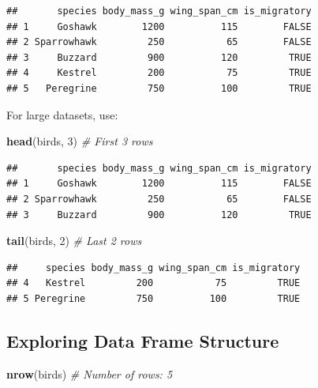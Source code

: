 \documentclass[
]{article}
\newenvironment{Shaded}{\begin{snugshade}}{\end{snugshade}}
\newcommand{\CommentTok}[1]{\textcolor[rgb]{0.56,0.35,0.01}{\textit{#1}}}
\newcommand{\DecValTok}[1]{\textcolor[rgb]{0.00,0.00,0.81}{#1}}
\newcommand{\FunctionTok}[1]{\textcolor[rgb]{0.13,0.29,0.53}{\textbf{#1}}}
\newcommand{\NormalTok}[1]{#1}
\begin{document}
\begin{verbatim}
##       species body_mass_g wing_span_cm is_migratory
## 1     Goshawk        1200          115        FALSE
## 2 Sparrowhawk         250           65        FALSE
## 3     Buzzard         900          120         TRUE
## 4     Kestrel         200           75         TRUE
## 5   Peregrine         750          100         TRUE
\end{verbatim}

For large datasets, use:

\begin{Shaded}
\begin{Highlighting}[]
\FunctionTok{head}\NormalTok{(birds, }\DecValTok{3}\NormalTok{)      }\CommentTok{\# First 3 rows}
\end{Highlighting}
\end{Shaded}

\begin{verbatim}
##       species body_mass_g wing_span_cm is_migratory
## 1     Goshawk        1200          115        FALSE
## 2 Sparrowhawk         250           65        FALSE
## 3     Buzzard         900          120         TRUE
\end{verbatim}

\begin{Shaded}
\begin{Highlighting}[]
\FunctionTok{tail}\NormalTok{(birds, }\DecValTok{2}\NormalTok{)      }\CommentTok{\# Last 2 rows}
\end{Highlighting}
\end{Shaded}

\begin{verbatim}
##     species body_mass_g wing_span_cm is_migratory
## 4   Kestrel         200           75         TRUE
## 5 Peregrine         750          100         TRUE
\end{verbatim}

\subsection{Exploring Data Frame
Structure}\label{exploring-data-frame-structure}

\begin{Shaded}
\begin{Highlighting}[]
\FunctionTok{nrow}\NormalTok{(birds)         }\CommentTok{\# Number of rows: 5}
\end{Highlighting}
\end{Shaded}
\end{document}
